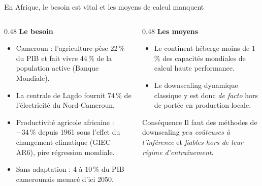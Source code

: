 \documentclass[aspectratio=169,10pt]{beamer}
\begin{document}
\begin{frame}{En Afrique, le besoin est vital et les moyens de calcul manquent}
  \begin{columns}[T]
    \begin{column}{0.48\textwidth}
      \textbf{Le besoin}
      \begin{itemize}
        \item Cameroun : l'agriculture pèse \alert{22\,\% du PIB} et fait vivre
              \alert{44\,\%} de la population active (Banque Mondiale).
        \item La centrale de Lagdo fournit \alert{74\,\%} de l'électricité du Nord-Cameroun.
        \item Productivité agricole africaine : \alert{$-34\,\%$ depuis 1961} sous l'effet
              du changement climatique (GIEC AR6), pire régression mondiale.
        \item Sans adaptation : \alert{4 à 10\,\% du PIB} camerounais menacé d'ici 2050.
      \end{itemize}
    \end{column}
    \begin{column}{0.48\textwidth}
      \textbf{Les moyens}
      \begin{itemize}
        \item Le continent héberge \alert{moins de 1\,\%} des capacités mondiales
              de calcul haute performance.
        \item Le downscaling dynamique classique y est donc \emph{de facto} hors
              de portée en production locale.
      \end{itemize}
      \vspace{0.2cm}
      \begin{block}{Conséquence}
        \small Il faut des méthodes de downscaling \emph{peu coûteuses à l'inférence}
        et \emph{fiables hors de leur régime d'entraînement}.
      \end{block}
    \end{column}
  \end{columns}
\end{frame}
\end{document}
